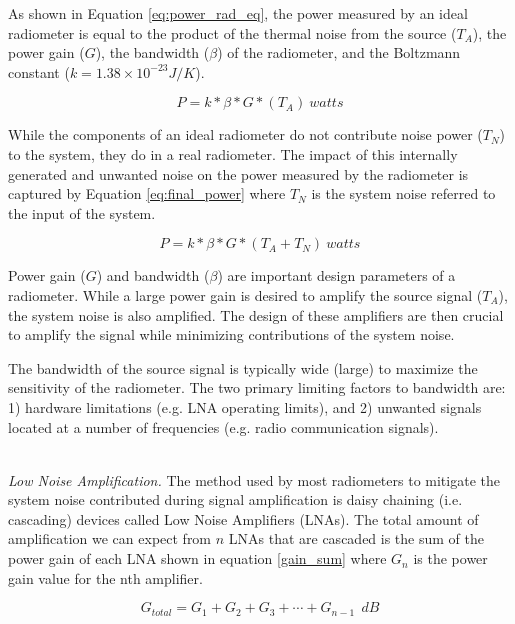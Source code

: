As shown in Equation \ref{eq:power_rad_eq}, the power measured by an ideal radiometer is equal to the product of the thermal noise from the source ($T_A$), the power gain ($G$), the bandwidth ($\beta$) of the radiometer, and the Boltzmann constant ($k=1.38 \times 10^{-23} J/K$).

\begin{equation} \label{eq:power_rad_eq}
P=k*\beta*G*(T_{A})\ watts
\end{equation}

While the components of an ideal radiometer do not contribute noise power ($T_N$) to the system, they do in a real radiometer.  The impact of this internally generated and unwanted noise on the power measured by the radiometer is captured by Equation \ref{eq:final_power} where $T_N$ is the system noise referred to the input of the system.

\begin{equation} \label{eq:final_power}
P=k*\beta*G*(T_{A}+T_{N})\ watts
\end{equation}

Power gain ($G$) and bandwidth ($\beta$) are important design parameters of a radiometer.  While a large power gain is desired to amplify the source signal ($T_A$), the system noise is also amplified.  The design of these amplifiers are then crucial to amplify the signal while minimizing contributions of the system noise.

The bandwidth of the source signal is typically wide (large) to maximize the sensitivity of the radiometer.  The two primary limiting factors to bandwidth are: 1) hardware limitations (e.g. LNA operating limits), and 2) unwanted signals located at a number of frequencies (e.g. radio communication signals).

\ \\

\emph{Low Noise Amplification.}  The method used by most radiometers to mitigate the system noise contributed during signal amplification is daisy chaining (i.e. cascading) devices called Low Noise Amplifiers (LNAs).  The total amount of amplification we can expect from $n$ LNAs that are cascaded is the sum of the power gain of each LNA shown in equation \ref{gain_sum} where $G_n$ is the power gain value for the nth amplifier.

\begin{equation}\label{gain_sum}
G_{total}=G_1 + G_2 + G_3 + \cdots +G_{n-1}\ \ dB
\end{equation}

